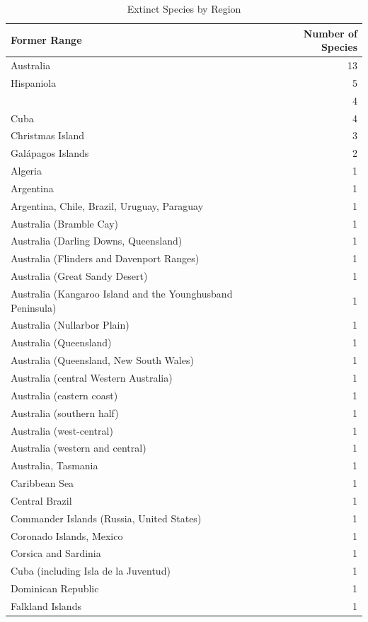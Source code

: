 \documentclass[
  letterpaper,
  DIV=11,
  numbers=noendperiod]{scrartcl}
\begin{document}
\begin{table}
\caption*{
{\large Extinct Species by Region}
} 
\fontsize{12.0pt}{14.4pt}\selectfont
\begin{tabular*}{\linewidth}{@{\extracolsep{\fill}}lr}
\toprule
Former Range & Number of Species \\ 
\midrule\addlinespace[2.5pt]
Australia & 13 \\ 
Hispaniola & 5 \\ 
 & 4 \\ 
Cuba & 4 \\ 
Christmas Island & 3 \\ 
Galápagos Islands & 2 \\ 
Algeria & 1 \\ 
Argentina & 1 \\ 
Argentina, Chile, Brazil, Uruguay, Paraguay & 1 \\ 
Australia (Bramble Cay) & 1 \\ 
Australia (Darling Downs, Queensland) & 1 \\ 
Australia (Flinders and Davenport Ranges) & 1 \\ 
Australia (Great Sandy Desert) & 1 \\ 
Australia (Kangaroo Island and the Younghusband Peninsula) & 1 \\ 
Australia (Nullarbor Plain) & 1 \\ 
Australia (Queensland) & 1 \\ 
Australia (Queensland, New South Wales) & 1 \\ 
Australia (central Western Australia) & 1 \\ 
Australia (eastern coast) & 1 \\ 
Australia (southern half) & 1 \\ 
Australia (west-central) & 1 \\ 
Australia (western and central) & 1 \\ 
Australia, Tasmania & 1 \\ 
Caribbean Sea & 1 \\ 
Central Brazil & 1 \\ 
Commander Islands (Russia, United States) & 1 \\ 
Coronado Islands, Mexico & 1 \\ 
Corsica and Sardinia & 1 \\ 
Cuba (including Isla de la Juventud) & 1 \\ 
Dominican Republic & 1 \\ 
Falkland Islands & 1 \\ 

\end{tabular*}
\end{table}
\end{document}
